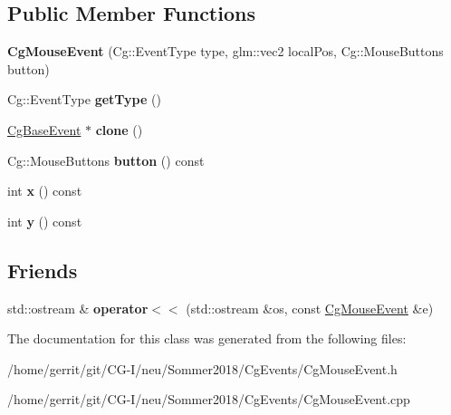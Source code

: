 \subsection*{Public Member Functions}
\begin{DoxyCompactItemize}
\item 
\mbox{\label{class_cg_mouse_event_ab45bfacef2f2bd08488ef33849f02175}} 
{\bfseries Cg\+Mouse\+Event} (Cg\+::\+Event\+Type type, glm\+::vec2 local\+Pos, Cg\+::\+Mouse\+Buttons button)
\item 
\mbox{\label{class_cg_mouse_event_a26bf6fcab812c13776b9cd542579301b}} 
Cg\+::\+Event\+Type {\bfseries get\+Type} ()
\item 
\mbox{\label{class_cg_mouse_event_a963cd0b90929692a0a12309989397dab}} 
\hyperlink{class_cg_base_event}{Cg\+Base\+Event} $\ast$ {\bfseries clone} ()
\item 
\mbox{\label{class_cg_mouse_event_a0aab289a0abbdd21058bc58606d656c8}} 
Cg\+::\+Mouse\+Buttons {\bfseries button} () const
\item 
\mbox{\label{class_cg_mouse_event_a37f58507bb2f5cb1196a4187938ea94f}} 
int {\bfseries x} () const
\item 
\mbox{\label{class_cg_mouse_event_a1bb8cab9a5ea9b6a7502738f1cc510f7}} 
int {\bfseries y} () const
\end{DoxyCompactItemize}
\subsection*{Friends}
\begin{DoxyCompactItemize}
\item 
\mbox{\label{class_cg_mouse_event_a066eb755418abf778fa380dcc12a3a1a}} 
std\+::ostream \& {\bfseries operator$<$$<$} (std\+::ostream \&os, const \hyperlink{class_cg_mouse_event}{Cg\+Mouse\+Event} \&e)
\end{DoxyCompactItemize}


The documentation for this class was generated from the following files\+:\begin{DoxyCompactItemize}
\item 
/home/gerrit/git/\+C\+G-\/\+I/neu/\+Sommer2018/\+Cg\+Events/Cg\+Mouse\+Event.\+h\item 
/home/gerrit/git/\+C\+G-\/\+I/neu/\+Sommer2018/\+Cg\+Events/Cg\+Mouse\+Event.\+cpp\end{DoxyCompactItemize}
